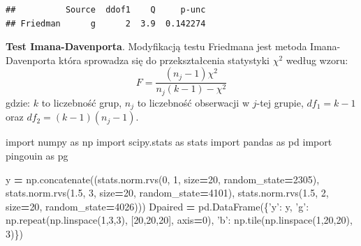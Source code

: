 \documentclass[polish,]{book}
\newenvironment{Shaded}{\begin{snugshade}}{\end{snugshade}}
\newcommand{\DecValTok}[1]{\textcolor[rgb]{0.00,0.00,0.81}{#1}}
\newcommand{\FloatTok}[1]{\textcolor[rgb]{0.00,0.00,0.81}{#1}}
\newcommand{\ImportTok}[1]{#1}
\newcommand{\NormalTok}[1]{#1}
\newcommand{\OperatorTok}[1]{\textcolor[rgb]{0.81,0.36,0.00}{\textbf{#1}}}
\newcommand{\StringTok}[1]{\textcolor[rgb]{0.31,0.60,0.02}{#1}}
\begin{document}
\begin{verbatim}
##          Source  ddof1    Q     p-unc
## Friedman      g      2  3.9  0.142274
\end{verbatim}

\textbf{Test Imana-Davenporta}. Modyfikacją testu Friedmana jest metoda Imana-Davenporta która sprowadza się do przekształcenia statystyki \(\chi^2\) według wzoru:
\begin{equation}
F=\frac{(n_j-1)\chi^2}{n_j(k-1)-\chi^2}
\label{eq:dep08}
\end{equation}
gdzie: \(k\) to liczebność grup, \(n_j\) to liczebność obserwacji w \(j\)-tej grupie, \(df_1=k-1\) oraz \(df_2=(k-1)(n_j-1)\).

\begin{Shaded}
\begin{Highlighting}[]
\ImportTok{import}\NormalTok{ numpy }\ImportTok{as}\NormalTok{ np}
\ImportTok{import}\NormalTok{ scipy.stats }\ImportTok{as}\NormalTok{ stats}
\ImportTok{import}\NormalTok{ pandas }\ImportTok{as}\NormalTok{ pd}
\ImportTok{import}\NormalTok{ pingouin }\ImportTok{as}\NormalTok{ pg}
  
\NormalTok{y }\OperatorTok{=}\NormalTok{ np.concatenate((stats.norm.rvs(}\DecValTok{0}\NormalTok{, }\DecValTok{1}\NormalTok{, size}\OperatorTok{=}\DecValTok{20}\NormalTok{, random_state}\OperatorTok{=}\DecValTok{2305}\NormalTok{),}
\NormalTok{                    stats.norm.rvs(}\FloatTok{1.5}\NormalTok{, }\DecValTok{3}\NormalTok{, size}\OperatorTok{=}\DecValTok{20}\NormalTok{, random_state}\OperatorTok{=}\DecValTok{4101}\NormalTok{),}
\NormalTok{                    stats.norm.rvs(}\FloatTok{1.5}\NormalTok{, }\DecValTok{2}\NormalTok{, size}\OperatorTok{=}\DecValTok{20}\NormalTok{, random_state}\OperatorTok{=}\DecValTok{4026}\NormalTok{)))}
\NormalTok{Dpaired }\OperatorTok{=}\NormalTok{ pd.DataFrame(\{}\StringTok{'y'}\NormalTok{: y,}
                        \StringTok{'g'}\NormalTok{: np.repeat(np.linspace(}\DecValTok{1}\NormalTok{,}\DecValTok{3}\NormalTok{,}\DecValTok{3}\NormalTok{), [}\DecValTok{20}\NormalTok{,}\DecValTok{20}\NormalTok{,}\DecValTok{20}\NormalTok{], axis}\OperatorTok{=}\DecValTok{0}\NormalTok{),}
                        \StringTok{'b'}\NormalTok{: np.tile(np.linspace(}\DecValTok{1}\NormalTok{,}\DecValTok{20}\NormalTok{,}\DecValTok{20}\NormalTok{), }\DecValTok{3}\NormalTok{)\})}


\end{Highlighting}
\end{Shaded}
\end{document}
